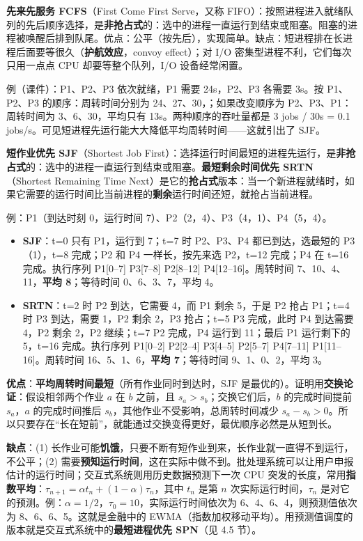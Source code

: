 \textbf{先来先服务 FCFS}（First Come First Serve，又称 FIFO）：按照进程进入就绪队列的先后顺序选择，是\textbf{非抢占式}的：选中的进程一直运行到结束或阻塞。阻塞的进程被唤醒后排到队尾。优点：公平（按先后），实现简单。缺点：短进程排在长进程后面要等很久（\textbf{护航效应}，convoy effect）；对 I/O 密集型进程不利，它们每次只用一点点 CPU 却要等整个队列，I/O 设备经常闲置。

例（课件）：P1、P2、P3 依次就绪，P1 需要 24s，P2、P3 各需要 3s。按 P1、P2、P3 的顺序：周转时间分别为 24、27、30，；如果改变顺序为 P2、P3、P1：周转时间为 3、6、30，平均只有 13s。两种顺序的吞吐量都是 3 jobs / 30s = 0.1 jobs/s。可见短进程先运行能大大降低平均周转时间——这就引出了 SJF。

\textbf{短作业优先 SJF}（Shortest Job First）：选择运行时间最短的进程先运行，是\textbf{非抢占式}的：选中的进程一直运行到结束或阻塞。\textbf{最短剩余时间优先 SRTN}（Shortest Remaining Time Next）是它的\textbf{抢占式}版本：当一个新进程就绪时，如果它需要的运行时间比当前进程的\textbf{剩余}运行时间还短，就抢占当前进程。

例：P1（到达时刻 0，运行时间 7）、P2（2，4）、P3（4，1）、P4（5，4）。
\begin{itemize}
    \item \textbf{SJF}：t=0 只有 P1，运行到 7；t=7 时 P2、P3、P4 都已到达，选最短的 P3（1），t=8 完成；P2 和 P4 一样长，按先来选 P2，t=12 完成；P4 在 t=16 完成。执行序列 P1[0–7] P3[7–8] P2[8–12] P4[12–16]。周转时间 7、10、4、11，\textbf{平均 8}；等待时间 0、6、3、7，平均 4。
    \item \textbf{SRTN}：t=2 时 P2 到达，它需要 4，而 P1 剩余 5，于是 P2 抢占 P1；t=4 时 P3 到达，需要 1，P2 剩余 2，P3 抢占；t=5 P3 完成，此时 P4 到达需要 4，P2 剩余 2，P2 继续；t=7 P2 完成，P4 运行到 11；最后 P1 运行剩下的 5，t=16 完成。执行序列 P1[0–2] P2[2–4] P3[4–5] P2[5–7] P4[7–11] P1[11–16]。周转时间 16、5、1、6，\textbf{平均 7}；等待时间 9、1、0、2，平均 3。
\end{itemize}
\textbf{优点}：\textbf{平均周转时间最短}（所有作业同时到达时，SJF 是最优的）。证明用\textbf{交换论证}：假设相邻两个作业 $a$ 在 $b$ 之前，且 $s_a > s_b$；交换它们后，$b$ 的完成时间提前 $s_a$，$a$ 的完成时间推后 $s_b$，其他作业不受影响，总周转时间减少 $s_a - s_b > 0$。所以只要存在“长在短前”，就能通过交换变得更好，最优顺序必然是从短到长。

\textbf{缺点}：(1) 长作业可能\textbf{饥饿}，只要不断有短作业到来，长作业就一直得不到运行，不公平；(2) 需要\textbf{预知运行时间}，这在实际中做不到。批处理系统可以让用户申报估计的运行时间；交互式系统则用历史数据预测下一次 CPU 突发的长度，常用\textbf{指数平均}：$\tau_{n+1} = \alpha t_n + (1-\alpha)\tau_n$，其中 $t_n$ 是第 $n$ 次实际运行时间，$\tau_n$ 是对它的预测。例：$\alpha = 1/2$，$\tau_0 = 10$，实际运行时间依次为 6、4、6、4，则预测值依次为 8、6、6、5。这就是金融中的 EWMA（指数加权移动平均）。用预测值调度的版本就是交互式系统中的\textbf{最短进程优先 SPN}（见 4.5 节）。


